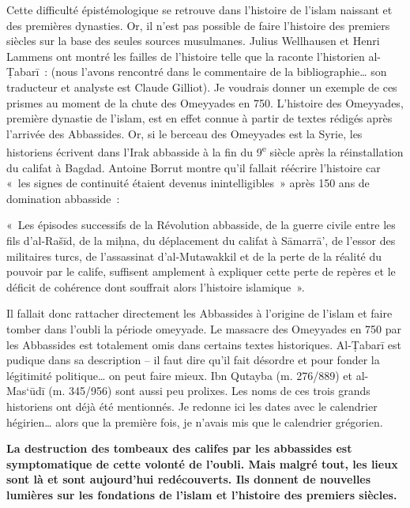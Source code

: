 Cette difficulté épistémologique se retrouve dans l'histoire de l'islam
naissant et des premières dynasties. Or, il n'est pas possible de faire
l'histoire des premiers siècles sur la base des seules sources
musulmanes. Julius Wellhausen et Henri Lammens ont montré les failles de
l'histoire telle que la raconte l'historien al-Ṭabarī~: (nous l'avons
rencontré dans le commentaire de la bibliographie\ldots{} son traducteur
et analyste est Claude Gilliot). Je voudrais donner un exemple de ces
prismes au moment de la chute des Omeyyades en 750.
L'histoire des Omeyyades, première dynastie de l'islam, est en effet
connue à partir de textes rédigés après l'arrivée des Abbassides. Or, si
le berceau des Omeyyades est la Syrie, les historiens écrivent dans
l'Irak abbasside à la fin du 9\textsuperscript{e} siècle après la
réinstallation du califat à Bagdad. Antoine Borrut montre qu'il fallait
réécrire l'histoire car «~les signes de continuité étaient devenus
inintelligibles~» après 150 ans de domination abbasside~:

«~Les épisodes successifs de la Révolution abbasside, de la guerre
civile entre les fils d'al-Rašīd, de la miḥna, du déplacement du califat
à Sāmarrā', de l'essor des militaires turcs, de l'assassinat
d'al-Mutawakkil et de la perte de la réalité du pouvoir par le calife,
suffisent amplement à expliquer cette perte de repères et le déficit de
cohérence dont souffrait alors l'histoire islamique~».

Il fallait donc rattacher directement les Abbassides à l'origine de
l'islam et faire tomber dans l'oubli la période omeyyade. Le massacre
des Omeyyades en 750 par les Abbassides est totalement omis dans
certains textes historiques. Al-Ṭabarī est pudique dans sa description
-- il faut dire qu'il fait désordre et pour fonder la légitimité
politique\ldots{} on peut faire mieux. Ibn Qutayba (m. 276/889) et
al-Mas`ūdī (m. 345/956) sont aussi peu prolixes. Les noms de ces trois
grands historiens ont déjà été mentionnés. Je redonne ici les dates avec
le calendrier hégirien\ldots{} alors que la première fois, je n'avais
mis que le calendrier grégorien.

\textbf{La destruction des tombeaux des califes par les abbassides est
symptomatique de cette volonté de l'oubli. Mais malgré tout, les lieux
sont là et sont aujourd'hui redécouverts. Ils donnent de nouvelles
lumières sur les fondations de l'islam et l'histoire des premiers
siècles.}